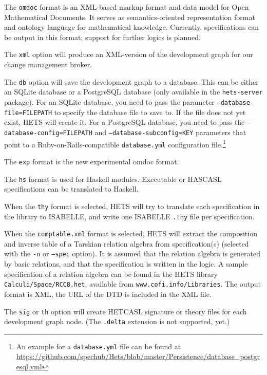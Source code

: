 \documentclass{article}
\newcommand{\normalTEXTSC}[2]{{#1\scriptsize#2}}
\newcommand     {\Hets}{\normalTEXTSC{H}{ETS}\xspace}
\newcommand     {\Isabelle}{\normalTEXTSC{I}{SABELLE}\xspace}
\newcommand     {\HasCASL}{\normalTEXTSC{H}{AS}\normalTEXTSC{C}{ASL}\xspace}
\newcommand{\HetCASL}{\normalTEXTSC{H}{ET}\normalTEXTSC{C}{ASL}\xspace}
\begin{document}
\begin{description}
The \texttt{omdoc} format \cite{books/sp/Kohlhase06} is an XML-based
markup format and data model for Open Mathematical Documents. It
serves as semantics-oriented representation format and ontology
language for mathematical knowledge. Currently, \CASL specifications
can be output in this format; support for further logics is planned.

The \texttt{xml} option will produce an XML-version of the development graph
for our change management broker.

The \texttt{db} option will save the development graph to a database.
This can be either an SQLite database or a PostgreSQL database (only available
in the \texttt{hets-server} package). For an SQLite database, you need to pass
the parameter \texttt{--database-file=FILEPATH} to specify the database file to
save to. If the file does not yet exist, \Hets will create it.
For a PostgreSQL database, you need to pass the
\texttt{--database-config=FILEPATH} and \texttt{--database-subconfig=KEY}
parameters that point to a Ruby-on-Rails-compatible \texttt{database.yml}
configuration file.\footnote{An example for a \texttt{database.yml} file can be
found at \url{https://github.com/spechub/Hets/blob/master/Persistence/database_postgresql.yml}}

The \texttt{exp} format is the new experimental omdoc format.

The \texttt{hs} format is used for Haskell modules. Executable \CASL or
\HasCASL specifications can be translated to Haskell.

When the \texttt{thy} format is selected, \Hets will try to translate
each specification in the library to \Isabelle, and write one \Isabelle
\texttt{.thy} file per specification.

When the \texttt{comptable.xml} format is selected, \Hets will extract
the composition and inverse table of a Tarskian relation algebra from
specification(s) (selected with the \texttt{-n} or \texttt{--spec}
option). It is assumed that the relation algebra is
generated by basic relations, and that the specification is written
in the \CASL logic. A sample specification of a relation
algebra can be found in the \Hets library \texttt{Calculi/Space/RCC8.het},
available from \texttt{www.cofi.info/Libraries}.
The output format is XML, the URL of the DTD is included in the
XML file.

The \texttt{sig} or \texttt{th} option will create \HetCASL signature or
theory files for each development graph node. (The \texttt{.delta} extension
is not supported, yet.)


\end{description}
\end{document}
